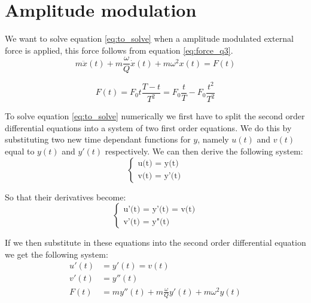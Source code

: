 \section{Amplitude modulation}

We want to solve equation \ref{eq:to_solve} when a amplitude modulated external force is applied, this force follows from equation \ref{eq:force_q3}.\\

\begin{equation}
    m \ddot{x}(t)+m\frac{\omega}{Q}\dot{x}(t)+m \omega^2 x(t) = F(t)
    \label{eq:to_solve}
\end{equation}

\begin{equation}
    F(t) = F_0 t\frac{T-t}{T^2}= F_0 \frac{t}{T} - F_0 \frac{t^2}{T^2}
    \label{eq:force_q3}
\end{equation}

To solve equation \ref{eq:to_solve} numerically we first have to split the second order differential equations into a system of two first order equations. We do this by substituting two new time dependant functions for $y$, namely $u(t)$ and $v(t)$ equal to $y(t)$ and $y'(t)$ respectively. We can then derive the following system:\\

\begin{equation*}
    \left\{ \begin{matrix} \mbox{u(t) = y(t)}\\
    \mbox{v(t) = y'(t)} \end{matrix} \right.
\end{equation*}

So that their derivatives become:\\

\begin{equation*}
    \left\{ \begin{matrix} \mbox{u'(t) = y'(t) = v(t)}\\
    \mbox{v'(t) = y"(t)} \end{matrix} \right.
\end{equation*}

If we then substitute in these equations into the second order differential equation we get the following system:\\

\begin{align*}
    u'(t) &= y'(t) = v(t)\\
    v'(t) &= y''(t)\\
    F(t) &= m y''(t)+m\frac{\omega}{Q}y'(t)+m \omega^2 y(t)\\
\end{align*}

